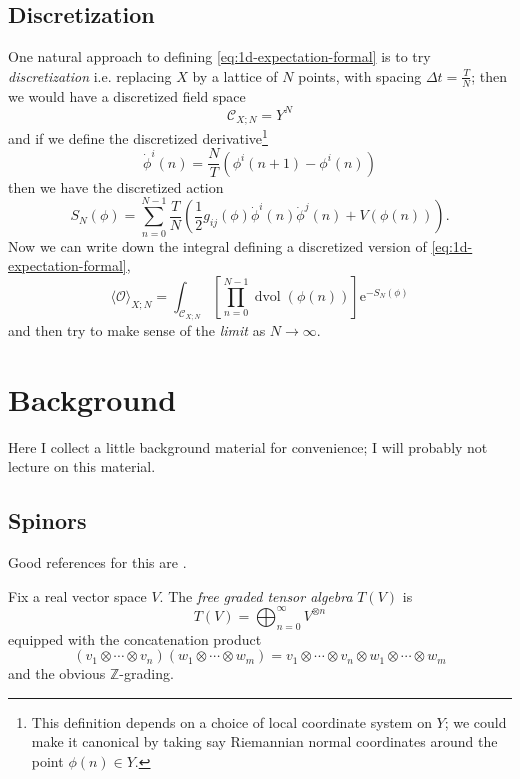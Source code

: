 \documentclass[12pt,letterpaper,reqno]{article}
\numberwithin{equation}{section}
\newcommand{\cC}{\ensuremath{\mathcal C}}
\newcommand{\cO}{\ensuremath{\mathcal O}}
\newcommand{\Z}{\ensuremath{\mathbb Z}}
\newcommand{\half}{\ensuremath{\frac{1}{2}}}
\newcommand{\e}{{\mathrm e}}
\newcommand{\IP}[1]{\langle#1\rangle}
\newcommand{\ti}[1]{\textit{#1}}
\DeclareMathOperator{\dvol}{dvol}
\begin{document}
\subsection{Discretization}

One natural approach to defining 
\eqref{eq:1d-expectation-formal} 
is to try \ti{discretization} i.e. replacing $X$ by a lattice
of $N$ points, with spacing $\Delta t = \frac{T}{N}$; then we would have
a discretized field space
\begin{equation}
  \cC_{X;N} = Y^N
\end{equation}
and if we define the discretized derivative\footnote{This definition 
depends on a choice of local coordinate system on $Y$; we could make it canonical by taking say Riemannian normal coordinates around the point $\phi(n) \in Y$.}
\begin{equation}
  \dot\phi^i(n) = \frac{N}{T}(\phi^i(n+1)-\phi^i(n))
\end{equation}
then we have the discretized action
\begin{equation}
  S_N(\phi) = \sum_{n=0}^{N-1} \frac{T}{N} \left( \half g_{ij}(\phi) \dot\phi^i(n)\dot\phi^j(n) + V(\phi(n)) \right).
\end{equation}
Now we can write down the integral 
defining a discretized version
of \eqref{eq:1d-expectation-formal}, 
\begin{equation}
  \IP{\cO}_{X;N} = \int_{\cC_{X;N}} \left[ \prod_{n=0}^{N-1} \dvol(\phi(n)) \right] \e^{-S_N(\phi)} 
\end{equation}
and then try to make sense of the \ti{limit} as $N \to \infty$.

\cite{MR1698956}

\appendix

\section{Background}

Here I collect a little background material for convenience; I will probably
not lecture on this material.

\subsection{Spinors}

Good references for this are \cite{MR1031992,MR1367507}.

\begin{defn} Fix a real vector space $V$. The
\ti{free graded tensor algebra} $T(V)$ is
\begin{equation}
  T(V) = \bigoplus_{n=0}^\infty V^{\otimes n}
\end{equation}
equipped with the concatenation product
\begin{equation}
  (v_1 \otimes \cdots \otimes v_n) (w_1 \otimes \cdots \otimes w_m) = v_1 \otimes \cdots \otimes v_n \otimes w_1 \otimes \cdots \otimes w_m
\end{equation}
and the obvious $\Z$-grading.
\end{defn}
\end{document}
